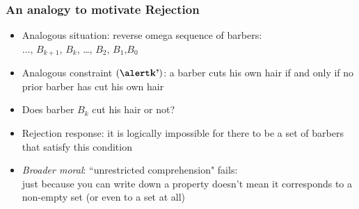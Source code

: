 \begin{frame}
\frametitle{An analogy to motivate Rejection}

\begin{itemize}[<+->]

\item Analogous situation: reverse omega sequence of barbers: \\ $\dots$, $B_{k+1}$, $B_k$, \dots, $B_2$, $B_1$,$B_0$

\item Analogous constraint $(\emph{k'})$: a barber cuts his own hair if and only if no prior barber has cut his own hair

\item Does barber $B_k$ cut his hair or not?

\item Rejection response: it is logically impossible for there to be a set of barbers that satisfy this condition

\item \emph{Broader moral}: ``unrestricted comprehension" fails: \\ just because you can write down a property doesn't mean it corresponds to a non-empty set (or even to a set at all) 



\end{itemize}
\end{frame}


